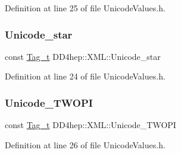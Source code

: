 Definition at line 25 of file Unicode\+Values.\+h.

\hypertarget{namespace_d_d4hep_1_1_x_m_l_a9c5a99a4c53c8e2863e423fa4d498dab}{}\label{namespace_d_d4hep_1_1_x_m_l_a9c5a99a4c53c8e2863e423fa4d498dab} 
\subsubsection{\texorpdfstring{Unicode\+\_\+star}{Unicode\_star}}
{\footnotesize\ttfamily const \hyperlink{class_d_d4hep_1_1_x_m_l_1_1_tag__t}{Tag\+\_\+t} D\+D4hep\+::\+X\+M\+L\+::\+Unicode\+\_\+star}



Definition at line 24 of file Unicode\+Values.\+h.

\hypertarget{namespace_d_d4hep_1_1_x_m_l_ac948f17a359f598cab29aa94191144fc}{}\label{namespace_d_d4hep_1_1_x_m_l_ac948f17a359f598cab29aa94191144fc} 
\subsubsection{\texorpdfstring{Unicode\+\_\+\+T\+W\+O\+PI}{Unicode\_TWOPI}}
{\footnotesize\ttfamily const \hyperlink{class_d_d4hep_1_1_x_m_l_1_1_tag__t}{Tag\+\_\+t} D\+D4hep\+::\+X\+M\+L\+::\+Unicode\+\_\+\+T\+W\+O\+PI}



Definition at line 26 of file Unicode\+Values.\+h.

